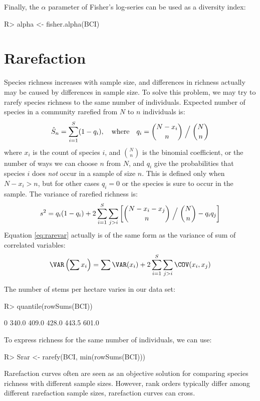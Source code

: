 \documentclass[article,nojss]{jss}
\begin{document}
Finally, the $\alpha$ parameter of Fisher's log-series can be used as
a diversity index:
\begin{Schunk}
\begin{Sinput}
R> alpha <- fisher.alpha(BCI)
\end{Sinput}
\end{Schunk}

\section{Rarefaction}

Species richness increases with sample size, and differences in
richness actually may be caused by differences in sample size.  To
solve this problem, we may try to rarefy species richness to the same
number of individuals.  Expected number of species in a community
rarefied from $N$ to $n$ individuals is:
\begin{equation}
\label{eq:rare}
\hat S_n = \sum_{i=1}^S (1 - q_i),\quad \text{where} \quad q_i = {N-x_i
  \choose n} \Bigm /{N \choose n}
\end{equation}
where $x_i$ is the count of species $i$, and ${N \choose n}$ is the
binomial coefficient, or the number of ways we can choose $n$ from
$N$, and $q_i$ give the probabilities that species $i$ does \emph{not} occur in a
sample of size $n$.  This is defined only when $N-x_i > n$, but for
other cases $q_i = 0$ or the species is sure to occur in the sample.
The variance of rarefied richness is:
\begin{equation}
\label{eq:rarevar}
s^2 = q_i (1-q_i) + 2 \sum_{i=1}^S \sum_{j>i} \left[ {N- x_i - x_j
    \choose n} \Bigm / {N
    \choose n} - q_i q_j\right]
\end{equation}
Equation \ref{eq:rarevar} actually is of the same form as the variance
of sum of correlated variables:
\begin{equation}
\VAR \left(\sum x_i \right) = \sum \VAR (x_i) + 2 \sum_{i=1}^S
\sum_{j>i} \COV (x_i, x_j)
\end{equation}

The number of stems per hectare varies in our
data set:
\begin{Schunk}
\begin{Sinput}
R> quantile(rowSums(BCI))
\end{Sinput}
\begin{Soutput}
   0%   25%   50%   75%  100% 
340.0 409.0 428.0 443.5 601.0 
\end{Soutput}
\end{Schunk}
To express richness for the same number of individuals, we can use:
\begin{Schunk}
\begin{Sinput}
R> Srar <- rarefy(BCI, min(rowSums(BCI)))
\end{Sinput}
\end{Schunk}
Rarefaction curves often are seen as an objective solution for
comparing species richness with different sample sizes.  However, rank
orders typically differ among different rarefaction sample sizes,
rarefaction curves can cross.
\end{document}
